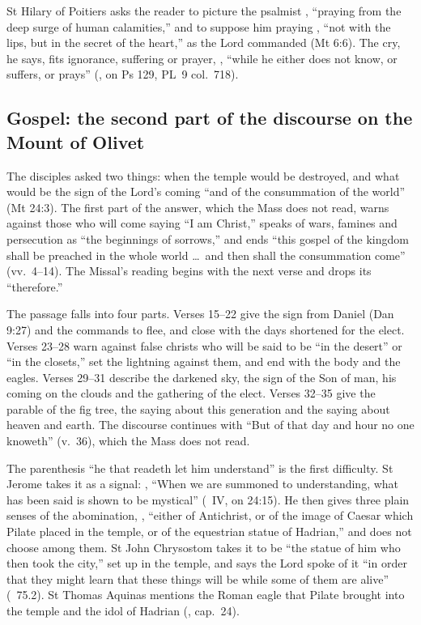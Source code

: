 St Hilary of Poitiers asks the reader to picture the psalmist , ``praying from the deep surge
of human calamities,'' and to suppose him praying , ``not with the lips, but in the secret of the heart,''
as the Lord commanded (Mt 6:6). The cry, he says, fits ignorance, suffering or
prayer, , ``while he either
does not know, or suffers, or prays'' (, on Ps
129, PL~9 col.~718).

\subsection{Gospel: the second part of the discourse on the Mount of Olivet}
\label{sec:element-gospel}

The disciples asked two things: when the temple would be destroyed, and what
would be the sign of the Lord's coming ``and of the consummation of the
world'' (Mt 24:3). The first part of the answer, which the Mass does not read,
warns against those who will come saying ``I am Christ,'' speaks of wars,
famines and persecution as ``the beginnings of sorrows,'' and ends ``this
gospel of the kingdom shall be preached in the whole world \dots\ and then
shall the consummation come'' (vv.~4--14). The Missal's reading begins with
the next verse and drops its ``therefore.''

The passage falls into four parts. Verses 15--22 give the sign from Daniel
(Dan 9:27) and the commands to flee, and close with the days shortened for the
elect. Verses 23--28 warn against false christs who will be said to be ``in
the desert'' or ``in the closets,'' set the lightning against them, and end
with the body and the eagles. Verses 29--31 describe the darkened sky, the
sign of the Son of man, his coming on the clouds and the gathering of the
elect. Verses 32--35 give the parable of the fig tree, the saying about this
generation and the saying about heaven and earth. The discourse continues with
``But of that day and hour no one knoweth'' (v.~36), which the Mass does not
read.

The parenthesis ``he that readeth let him understand'' is the first
difficulty. St Jerome takes it as a signal: , ``When we are summoned
to understanding, what has been said is shown to be mystical'' (~IV, on 24:15). He then gives three plain senses of the
abomination, , ``either of Antichrist, or of the image of Caesar which Pilate placed
in the temple, or of the equestrian statue of Hadrian,'' and does not choose
among them. St John Chrysostom takes it to be ``the statue of him who then
took the city,'' set up in the temple, and says the Lord spoke of it ``in order
that they might learn that these things will be while some of them are alive''
(~75.2). St Thomas Aquinas mentions the
Roman eagle that Pilate brought into the temple and the idol of Hadrian
(, cap.~24).


